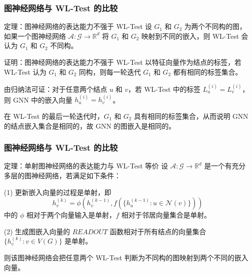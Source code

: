 \documentclass{beamer}
\begin{document}
\begin{frame}

  \frametitle{图神经网络与 WL-Test 的比较}
  \begin{alertblock}{定理：图神经网络的表达能力不强于 WL-Test}
    设 $G_1$ 和 $G_2$ 为两个不同构的图，如果一个图神经网络 $\mathcal{A}: \mathcal{G} \rightarrow \mathbb{R}^d$
    将 $G_1$ 和 $G_2$ 映射到不同的嵌入，则 WL-Test 会认为 $G_1$ 和 $G_2$ 不同构。
  \end{alertblock}
  \begin{block}{证明：图神经网络的表达能力不强于 WL-Test}
    以特征向量作为结点的标签，若 WL-Test 认为 $G_1$ 和 $G_2$ 同构，则每一轮迭代 $G_1$ 和 $G_2$ 都有相同的标签集合。
    
    由归纳法可证：对于任意两个结点 $u$ 和 $v$，若 WL-Test 中的标签 $L_u^{(i)} = L_v^{(i)}$，则 GNN 中的嵌入向量
    $h_u^{(i)} = h_v^{(i)}$。

    在 WL-Test 的最后一轮迭代时，$G_1$ 和 $G_2$ 具有相同的标签集合，从而说明 GNN 的结点嵌入集合是相同的，故
    GNN 的图嵌入是相同的。
  \end{block}

\end{frame}

\begin{frame}

  \frametitle{图神经网络与 WL-Test 的比较}
  \begin{alertblock}{定理：单射图神经网络的表达能力与 WL-Test 等价}
    设 $\mathcal{A}: \mathcal{G} \rightarrow \mathbb{R}^d$ 是一个有充分多层的图神经网络，若满足如下条件：

    (1) 更新嵌入向量的过程是单射，即
    $$ h_v^{(k)} = \phi(h_v^{(k-1)}, f(\{h_u^{(k-1)} : u \in \mathcal{N}(v)\})) $$
    中的 $\phi$ 相对于两个向量输入是单射，$f$ 相对于邻居向量集合是单射。

    (2) 生成图嵌入向量的 $READOUT$ 函数相对于所有结点的向量集合 $\{h_v^{(k)} : v \in V(G)\}$ 是单射。

    则该图神经网络会把任意两个 WL-Test 判断为不同构的图映射到两个不同的嵌入向量。

  \end{alertblock}

\end{frame}
\end{document}
